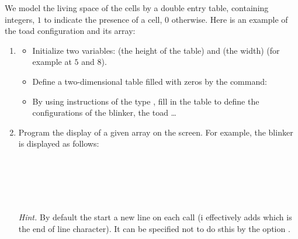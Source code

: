 \documentclass[11pt,class=report,crop=false]{standalone}
\begin{document}
\begin{activite}[Display]

We model the living space of the cells by a double entry table, containing integers, $1$ to indicate the presence of a cell, $0$ otherwise. Here is an example of the \og{}toad\fg{} configuration and its array:


\begin{enumerate}
  \item 
  \begin{itemize}
    \item Initialize two variables:  (the height of the table) and  (the width) (for example at $5$ and $8$).
    
    \item Define a two-dimensional table filled with zeros by the command:  
    
    \item By using instructions of the type , fill in the table to define the configurations of the blinker, the toad \ldots
  \end{itemize}
  
  \item Program the display of a given array on the screen. 
  For example, the blinker is displayed as follows:
  
\begin{center}
\\
\\
\\
\\
\end{center}

  \emph{Hint.} By default the  start a new line on each call (i effectively adds  which is the end of line character). It can be specified not to do sthis by the option .
  
\end{enumerate}
\end{activite}



\end{document}
